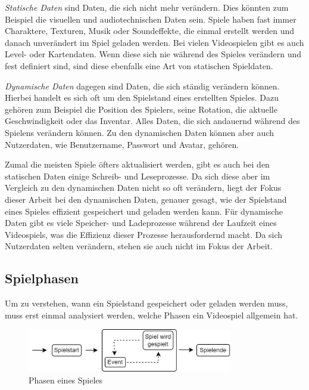 \textit{Statische Daten} sind Daten, die sich nicht mehr verändern. Dies könnten zum Beispiel die visuellen und audiotechnischen Daten sein. Spiele haben fast immer Charaktere, Texturen, Musik oder Soundeffekte, die einmal erstellt werden und danach unverändert im Spiel geladen werden. Bei vielen Videospielen gibt es auch Level- oder Kartendaten. Wenn diese sich nie während des Spieles verändern und fest definiert sind, sind diese ebenfalls eine Art von statischen Spieldaten. 

\textit{Dynamische Daten} dagegen sind Daten, die sich ständig verändern können. Hierbei handelt es sich oft um den Spielstand eines erstellten Spieles. Dazu gehören zum Beispiel die Position des Spielers, seine Rotation, die aktuelle Geschwindigkeit oder das Inventar. Alles Daten, die sich andauernd während des Spielens verändern können. Zu den dynamischen Daten können aber auch Nutzerdaten, wie Benutzername, Passwort und Avatar, gehören. 

Zumal die meisten Spiele öfters aktualisiert werden, gibt es auch bei den statischen Daten einige Schreib- und Leseprozesse.\cite{lin2017studying} Da sich diese aber im Vergleich zu den dynamischen Daten nicht so oft verändern, liegt der Fokus dieser Arbeit bei den dynamischen Daten, genauer gesagt, wie der Spielstand eines Spieles effizient gespeichert und geladen werden kann. Für dynamische Daten gibt es viele Speicher- und Ladeprozesse während der Laufzeit eines Videospiels, was die Effizienz dieser Prozesse herausfordernd macht. Da sich Nutzerdaten selten verändern, stehen sie auch nicht im Fokus der Arbeit. 


\subsection{Spielphasen} \label{ssect:spielphasen}
Um zu verstehen, wann ein Spielstand gespeichert oder geladen werden muss, muss erst einmal analysiert werden, welche Phasen ein Videospiel allgemein hat.

\begin{figure}[htp]
    \centering
    \includegraphics[width=0.8\textwidth]{images/Spielphasen.png}
    \caption{Phasen eines Spieles}
    \label{fig:spielphasen}
\end{figure}

